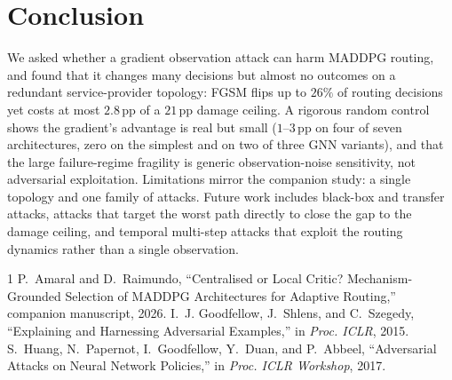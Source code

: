 \documentclass[10pt,journal,comsoc]{IEEEtran}
\begin{document}
\section{Conclusion}
\label{sec:conclusion}
We asked whether a gradient observation attack can harm MADDPG routing, and found
that it changes many decisions but almost no outcomes on a redundant
service-provider topology: FGSM flips up to $26\%$ of routing decisions yet costs at
most $2.8$\,pp of a $21$\,pp damage ceiling. A rigorous random control shows the
gradient's advantage is real but small ($1$--$3$\,pp on four of seven architectures,
zero on the simplest and on two of three GNN variants), and that the large
failure-regime fragility is generic observation-noise sensitivity, not adversarial
exploitation. Limitations mirror the companion study: a single topology and one
family of attacks. Future work includes black-box and transfer attacks, attacks that
target the worst path directly to close the gap to the damage ceiling, and temporal
multi-step attacks that exploit the routing dynamics rather than a single
observation.

\begin{thebibliography}{1}
 P.~Amaral and D.~Raimundo, ``Centralised or Local Critic?
Mechanism-Grounded Selection of MADDPG Architectures for Adaptive Routing,''
companion manuscript, 2026.
 I.~J. Goodfellow, J.~Shlens, and C.~Szegedy, ``Explaining
and Harnessing Adversarial Examples,'' in \emph{Proc. ICLR}, 2015.
 S.~Huang, N.~Papernot, I.~Goodfellow, Y.~Duan, and
P.~Abbeel, ``Adversarial Attacks on Neural Network Policies,'' in \emph{Proc. ICLR
Workshop}, 2017.
\end{thebibliography}
\end{document}
